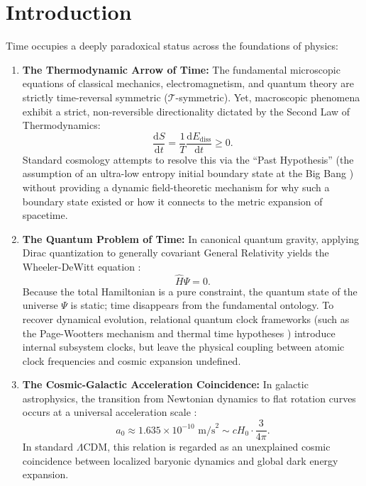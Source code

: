 \documentclass[aps,prd,reprint,superscriptaddress,nofootinbib,floatfix,amsmath,amssymb]{revtex4-2}
\begin{document}
\maketitle

\section{Introduction}
\label{sec:intro}

Time occupies a deeply paradoxical status across the foundations of physics:
\begin{enumerate}
    \item \textbf{The Thermodynamic Arrow of Time:} The fundamental microscopic equations of classical mechanics, electromagnetism, and quantum theory are strictly time-reversal symmetric ($\mathcal{T}$-symmetric). Yet, macroscopic phenomena exhibit a strict, non-reversible directionality dictated by the Second Law of Thermodynamics:
    \begin{equation}
    \frac{\mathrm{d}S}{\mathrm{d}t} = \frac{1}{T}\frac{\mathrm{d}E_{\text{diss}}}{\mathrm{d}t} \ge 0.
    \label{eq:second_law}
    \end{equation}
    Standard cosmology attempts to resolve this via the ``Past Hypothesis'' (the assumption of an ultra-low entropy initial boundary state at the Big Bang \cite{Penrose1979,CarrollChen2004}) without providing a dynamic field-theoretic mechanism for why such a boundary state existed or how it connects to the metric expansion of spacetime.
    \item \textbf{The Quantum Problem of Time:} In canonical quantum gravity, applying Dirac quantization to generally covariant General Relativity yields the Wheeler-DeWitt equation \cite{DeWitt1967}:
    \begin{equation}
    \hat{H}\Psi = 0.
    \label{eq:wheeler_dewitt}
    \end{equation}
    Because the total Hamiltonian is a pure constraint, the quantum state of the universe $\Psi$ is static; time disappears from the fundamental ontology. To recover dynamical evolution, relational quantum clock frameworks (such as the Page-Wootters mechanism \cite{PageWootters1983} and thermal time hypotheses \cite{Rovelli1991,ConnesRovelli1994}) introduce internal subsystem clocks, but leave the physical coupling between atomic clock frequencies and cosmic expansion undefined.
    \item \textbf{The Cosmic-Galactic Acceleration Coincidence:} In galactic astrophysics, the transition from Newtonian dynamics to flat rotation curves occurs at a universal acceleration scale \cite{McGaugh2016_RAR}:
    \begin{equation}
    a_0 \approx 1.635 \times 10^{-10}\text{ m/s}^2 \sim c H_0 \cdot \frac{3}{4\pi}.
    \label{eq:a0_coincidence}
    \end{equation}
    In standard $\Lambda\text{CDM}$, this relation is regarded as an unexplained cosmic coincidence between localized baryonic dynamics and global dark energy expansion.
\end{enumerate}
\end{document}
